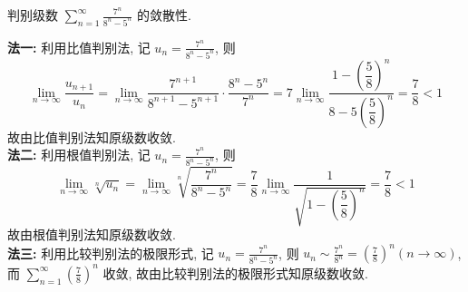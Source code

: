 \begin{example}
    判别级数 $\displaystyle \sum_{n=1}^{\infty} \frac{7^{n}}{8^{n}-5^{n}} $ 的敛散性.
\end{example}
\begin{solution}
    \textbf{法一: }利用比值判别法, 记 $\displaystyle u_{n}=\frac{7^{n}}{8^{n}-5^{n}} $, 则 $$\displaystyle \lim _{n \rightarrow \infty} \frac{u_{n+1}}{u_{n}}=\lim _{n \rightarrow \infty} \dfrac{7^{n+1}}{8^{n+1}-5^{n+1}} \cdot \dfrac{8^{n}-5^{n}}{7^{n}}=7 \lim _{n \rightarrow \infty} \frac{1-\left(\dfrac{5}{8}\right)^{n}}{8-5\left(\dfrac{5}{8}\right)^{n}}=\frac{7}{8}<1 $$
    故由比值判别法知原级数收敛.\\
    \textbf{法二: }利用根值判别法, 记 $\displaystyle u_{n}=\frac{7^{n}}{8^{n}-5^{n}} $, 则
    $$\lim _{n \rightarrow \infty} \sqrt[n]{u_{n}}=\lim _{n \rightarrow \infty} \sqrt[n]{\frac{7^{n}}{8^{n}-5^{n}}}=\frac{7}{8} \lim _{n \rightarrow \infty} \frac{1}{\sqrt{1-\left(\dfrac{5}{8}\right)^{n}}}=\frac{7}{8}<1$$
    故由根值判别法知原级数收敛.\\
    \textbf{法三: }利用比较判别法的极限形式, 记 $\displaystyle u_{n}=\frac{7^{n}}{8^{n}-5^{n}} $, 则 $\displaystyle u_{n} \sim \frac{7^{n}}{8^{n}}=\left(\frac{7}{8}\right)^{n}(n \rightarrow \infty) $, 而 $\displaystyle \sum_{n=1}^{\infty}\left(\frac{7}{8}\right)^{n} $ 收敛, 故由比较判别法的极限形式知原级数收敛.
\end{solution}


